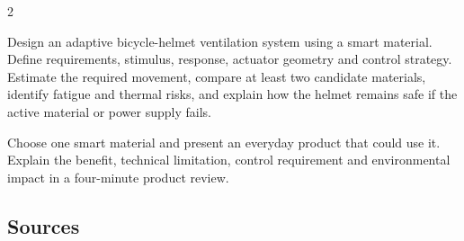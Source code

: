 \begin{multicols}{2}
\begin{engineeringchallenge}
Design an adaptive bicycle-helmet ventilation system using a smart material. Define requirements,
stimulus, response, actuator geometry and control strategy. Estimate the required movement, compare at
least two candidate materials, identify fatigue and thermal risks, and explain how the helmet remains
safe if the active material or power supply fails.
\end{engineeringchallenge}

\begin{speaking}
Choose one smart material and present an everyday product that could use it. Explain the benefit,
technical limitation, control requirement and environmental impact in a four-minute product review.
\end{speaking}
\end{multicols}

\subsection*{Sources}
